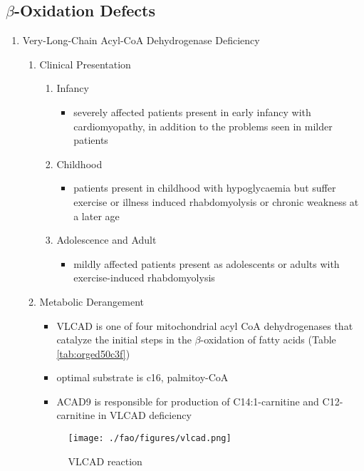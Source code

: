 \documentclass{scrartcl}
\begin{document}
\subsection{\(\beta\)-Oxidation Defects}
\label{sec:org2ecf874}
\begin{enumerate}
\item Very-Long-Chain Acyl-CoA Dehydrogenase Deficiency
\label{sec:org42a7e52}
\begin{enumerate}
\item Clinical Presentation
\label{sec:org54494a9}
\begin{enumerate}
\item Infancy
\label{sec:orgca870d2}
\begin{itemize}
\item severely affected patients present in early infancy with
cardiomyopathy, in addition to the problems seen in milder patients
\end{itemize}
\item Childhood
\label{sec:org21b9d97}
\begin{itemize}
\item patients present in childhood with hypoglycaemia but suffer exercise
or illness induced rhabdomyolysis or chronic weakness at a later age
\end{itemize}
\item Adolescence and Adult
\label{sec:org4cb2ea5}
\begin{itemize}
\item mildly affected patients present as adolescents or adults with
exercise-induced rhabdomyolysis
\end{itemize}
\end{enumerate}
\item Metabolic Derangement
\label{sec:orgf05fbdc}
\begin{itemize}
\item VLCAD is one of four mitochondrial acyl CoA dehydrogenases that
catalyze the initial steps in the \(\beta\)-oxidation of fatty acids
(Table \ref{tab:orged50c3f})
\item optimal substrate is c16, palmitoy-CoA
\item ACAD9 is responsible for production of C14:1-carnitine and
C12-carnitine in VLCAD deficiency
\end{itemize}
\begin{figure}[htbp]
\centering
\texttt{[image: ./fao/figures/vlcad.png]}
\caption{\label{fig:orga4f0def}
VLCAD reaction}
\end{figure}


\end{enumerate}
\end{enumerate}
\end{document}
